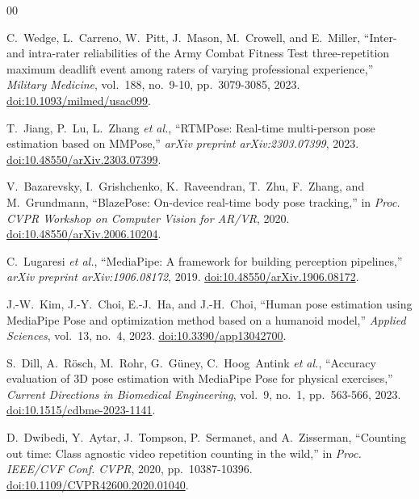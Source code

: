 \documentclass[conference]{IEEEtran}
\begin{document}
\begin{thebibliography}{00}

C.~Wedge, L.~Carreno, W.~Pitt, J.~Mason, M.~Crowell, and E.~Miller, ``Inter- and intra-rater reliabilities of the Army Combat Fitness Test three-repetition maximum deadlift event among raters of varying professional experience,'' \textit{Military Medicine}, vol.~188, no.~9-10, pp.~3079-3085, 2023. \href{https://doi.org/10.1093/milmed/usac099}{doi:10.1093/milmed/usac099}.

T.~Jiang, P.~Lu, L.~Zhang \textit{et al.}, ``RTMPose: Real-time multi-person pose estimation based on MMPose,'' \textit{arXiv preprint arXiv:2303.07399}, 2023. \href{https://doi.org/10.48550/arXiv.2303.07399}{doi:10.48550/arXiv.2303.07399}.

V.~Bazarevsky, I.~Grishchenko, K.~Raveendran, T.~Zhu, F.~Zhang, and M.~Grundmann, ``BlazePose: On-device real-time body pose tracking,'' in \textit{Proc. CVPR Workshop on Computer Vision for AR/VR}, 2020. \href{https://doi.org/10.48550/arXiv.2006.10204}{doi:10.48550/arXiv.2006.10204}.

C.~Lugaresi \textit{et al.}, ``MediaPipe: A framework for building perception pipelines,'' \textit{arXiv preprint arXiv:1906.08172}, 2019. \href{https://doi.org/10.48550/arXiv.1906.08172}{doi:10.48550/arXiv.1906.08172}.

J.-W.~Kim, J.-Y.~Choi, E.-J.~Ha, and J.-H.~Choi, ``Human pose estimation using MediaPipe Pose and optimization method based on a humanoid model,'' \textit{Applied Sciences}, vol.~13, no.~4, 2023. \href{https://doi.org/10.3390/app13042700}{doi:10.3390/app13042700}.

S.~Dill, A.~R\"{o}sch, M.~Rohr, G.~G\"{u}ney, C.~Hoog~Antink \textit{et al.}, ``Accuracy evaluation of 3D pose estimation with MediaPipe Pose for physical exercises,'' \textit{Current Directions in Biomedical Engineering}, vol.~9, no.~1, pp.~563-566, 2023. \href{https://doi.org/10.1515/cdbme-2023-1141}{doi:10.1515/cdbme-2023-1141}.

D.~Dwibedi, Y.~Aytar, J.~Tompson, P.~Sermanet, and A.~Zisserman, ``Counting out time: Class agnostic video repetition counting in the wild,'' in \textit{Proc. IEEE/CVF Conf. CVPR}, 2020, pp.~10387-10396. \href{https://doi.org/10.1109/CVPR42600.2020.01040}{doi:10.1109/CVPR42600.2020.01040}.


\end{thebibliography}
\end{document}
